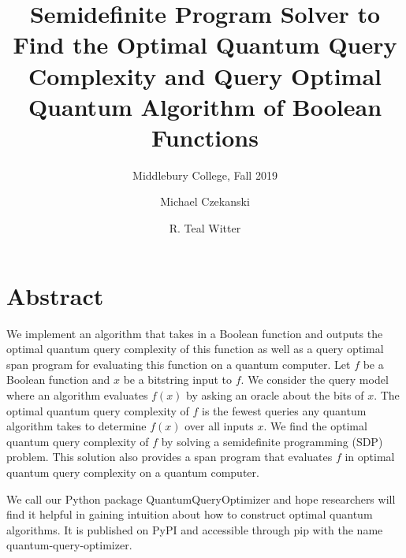 \documentclass[acmtog]{acmart}
\begin{document}
\title[Optimal Quantum Algorithms via Semidefinite Programming]{Semidefinite Program Solver to 
Find the Optimal Quantum Query Complexity
and Query Optimal Quantum Algorithm
of Boolean Functions}

\subtitle{Middlebury College, Fall 2019}

\author{Michael Czekanski}

\author{R. Teal Witter}

\maketitle

\graphicspath{{./../figures/}}
\section*{Abstract}

We implement an algorithm that takes in a Boolean function and outputs the optimal
quantum query complexity of this function as well as a query optimal span program
for evaluating this function on a quantum computer. 
Let $f$ be a Boolean function
and $x$ be a bitstring input to $f$.
We consider the query model where
an algorithm evaluates $f(x)$
by asking an oracle about the bits of $x$.
The optimal quantum query complexity of $f$
is the fewest queries any quantum algorithm
takes to determine $f(x)$ over all inputs $x$.
We find the optimal quantum query complexity
of $f$ by solving a semidefinite 
programming (SDP)
problem.
This solution also provides a span program 
that evaluates $f$ in optimal
quantum query complexity on a quantum computer.

We call our Python package QuantumQueryOptimizer
and hope researchers will find it helpful
in gaining intuition about how to construct optimal
quantum algorithms. It is published on PyPI and accessible through pip with the name
quantum-query-optimizer.









\end{document}
